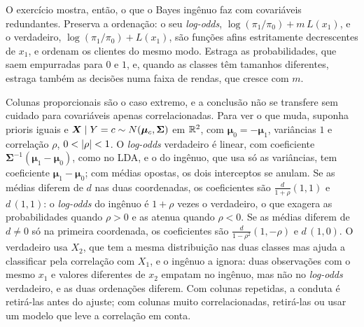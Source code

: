 \begin{solucao}
O exercício mostra, então, o que o Bayes ingênuo faz com covariáveis redundantes. Preserva a
ordenação: o seu \emph{log-odds}, $\log(\pi_1/\pi_0)+m\,L(x_1)$, e o verdadeiro,
$\log(\pi_1/\pi_0)+L(x_1)$, são funções afins estritamente decrescentes de $x_1$, e ordenam os
clientes do mesmo modo. Estraga as probabilidades, que saem empurradas para $0$ e $1$, e, quando
as classes têm tamanhos diferentes, estraga também as decisões numa faixa de rendas, que cresce
com $m$.

Colunas proporcionais são o caso extremo, e a conclusão não se transfere sem cuidado para
covariáveis apenas correlacionadas. Para ver o que muda, suponha prioris iguais e
$\bm{X}\mid Y=c\sim N(\bm\mu_c,\bm\Sigma)$ em $\mathbb{R}^2$, com $\bm\mu_0=-\bm\mu_1$, variâncias $1$ e
correlação $\rho$, $0<\left\lvert \rho \right\rvert<1$. O \emph{log-odds} verdadeiro é linear, com coeficiente
$\bm\Sigma^{-1}(\bm\mu_1-\bm\mu_0)$, como no LDA, e o do ingênuo, que usa só as variâncias, tem
coeficiente $\bm\mu_1-\bm\mu_0$; com médias opostas, os dois interceptos se anulam. Se as médias
diferem de $d$ nas duas coordenadas, os coeficientes são $\frac d{1+\rho}(1,1)$ e $d\,(1,1)$: o
\emph{log-odds} do ingênuo é $1+\rho$ vezes o verdadeiro, o que exagera as probabilidades quando
$\rho>0$ e as atenua quando $\rho<0$. Se as médias diferem de $d\ne0$ só na primeira coordenada,
os coeficientes são $\frac d{1-\rho^2}(1,-\rho)$ e $d\,(1,0)$. O verdadeiro usa $X_2$, que tem a
mesma distribuição nas duas classes mas ajuda a classificar pela correlação com $X_1$, e o
ingênuo a ignora: duas observações com o mesmo $x_1$ e valores diferentes de $x_2$ empatam no
ingênuo, mas não no \emph{log-odds} verdadeiro, e as duas ordenações diferem. Com colunas
repetidas, a conduta é retirá-las antes do ajuste; com colunas muito correlacionadas,
retirá-las ou usar um modelo que leve a correlação em conta.
\end{solucao}
